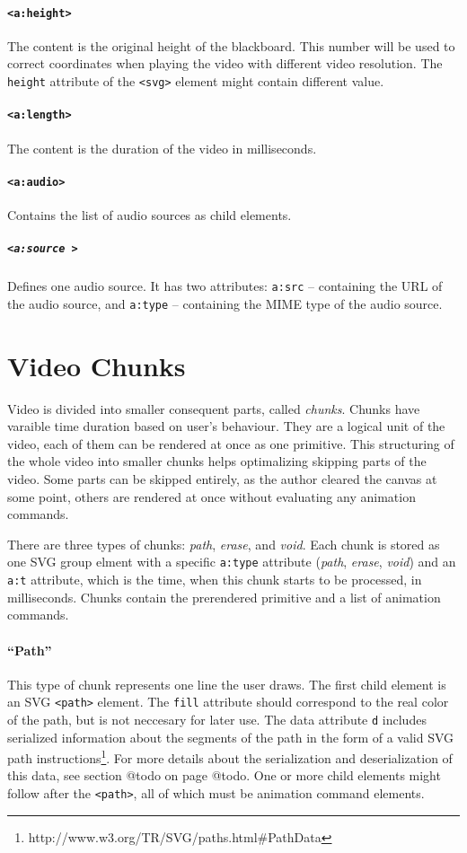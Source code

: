 \paragraph{\texttt{\textless a:height\textgreater}}
The content is the original height of the blackboard. This number will be used to correct coordinates when playing the video with different video resolution. The \verb|height| attribute of the \verb|<svg>| element might contain different value.

\paragraph{\texttt{\textless a:length\textgreater}}
The content is the duration of the video in milliseconds.

\paragraph{\texttt{\textless a:audio\textgreater}}
Contains the list of audio sources as child elements.

\subparagraph{\texttt{\textless a:source \textgreater}}
Defines one audio source. It has two attributes: \verb|a:src| -- containing the URL of the audio source, and \verb|a:type| -- containing the MIME type of the audio source.

\section{Video Chunks}
Video is divided into smaller consequent parts, called \textit{chunks}. Chunks have varaible time duration based on user's behaviour. They are a logical unit of the video, each of them can be rendered at once as one primitive. This structuring of the whole video into smaller chunks helps optimalizing skipping parts of the video. Some parts can be skipped entirely, as the author cleared the canvas at some point, others are rendered at once without evaluating any animation commands.

There are three types of chunks: \textit{path}, \textit{erase}, and \textit{void}. Each chunk is stored as one SVG group elment with a specific \verb|a:type| attribute (\textit{path}, \textit{erase}, \textit{void}) and an \verb|a:t| attribute, which is the time, when this chunk starts to be processed, in milliseconds. Chunks contain the prerendered primitive and a list of animation commands.

\paragraph{``Path''}
This type of chunk represents one line the user draws. The first child element is an SVG \verb|<path>| element. The \verb|fill| attribute should correspond to the real color of the path, but is not neccesary for later use. The data attribute \verb|d| includes serialized information about the segments of the path in the form of a valid SVG path instructions\footnote{http://www.w3.org/TR/SVG/paths.html\#PathData}. For more details about the serialization and deserialization of this data, see section @todo on page @todo. One or more child elements might follow after the \verb|<path>|, all of which must be animation command elements.


